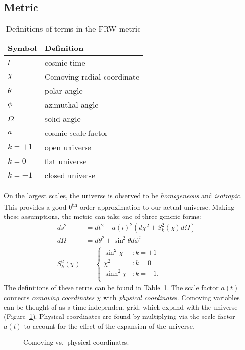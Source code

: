 \subsection{Metric}
\begin{table}
  \centering
\begin{tabular}{ll}
 \toprule
  Symbol & Definition \\
 \midrule
 \midrule
  $t$ & cosmic time \\
  $\chi$ & Comoving radial coordinate \\
  $\theta$ & polar angle \\
  $\phi$ & azimuthal angle \\
  $\Omega$ & solid angle \\
  $a$ & cosmic scale factor \\
  $k=+1$ & open universe \\
  $k=0$ & flat universe \\
  $k=-1$ & closed universe \\
 \bottomrule
\end{tabular}
\caption{Definitions of terms in the FRW metric}\label{tab:cos:metric}
\end{table}

On the largest scales, the universe is observed to be {\em homogeneous\/} and {\em isotropic}. This provides a good 0\textsuperscript{th}-order approximation to our actual universe. Making these assumptions, the metric can take one of three generic forms:
\begin{align}
  ds^2 &= dt^2 - a{(t)}^2\left( d\chi^2 + S_k^2{(\chi)} d\Omega \right)
  \label{eqn:cos:FRW_metric}\\
  d\Omega &= d\theta^2 + \sin^2\theta d\phi^2
  \label{eqn:cos:angle_element}\\
  S_k^2(\chi) &=
  \left\{
  \begin{array}{rl}
    \sin^2\chi &: k=+1 \\
    \chi^2 &: k=0 \\
    \sinh^2\chi &: k=-1. \\
  \end{array}
  \right.\label{eqn:cos:S_def}
\end{align}
The definitions of these terms can be found in Table~\ref{tab:cos:metric}. The scale factor $a(t)$ connects {\em comoving coordinates\/} $\chi$ with {\em physical coordinates}. Comoving variables can be thought of as a time-independent grid, which expand with the universe (Figure~\ref{fig:cos:comoving_vs_physical}). Physical coordinates are found by multiplying via the scale factor $a(t)$ to account for the effect of the expansion of the universe.
\begin{figure}
  \centering
  
  \caption{Comoving vs.\ physical coordinates.\label{fig:cos:comoving_vs_physical}}
\end{figure}




